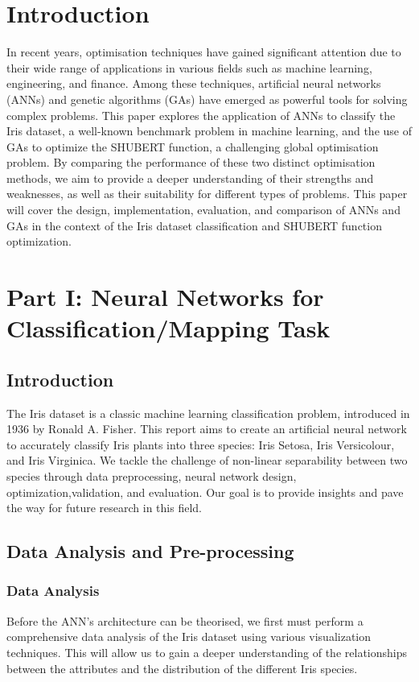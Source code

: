 \documentclass[conference]{inc/IEEEtran}
\begin{document}
\section{Introduction}
In recent years, optimisation techniques have gained significant attention due to their wide range of applications in various fields such as machine learning, engineering, and finance. Among these techniques, artificial neural networks (ANNs) and genetic algorithms (GAs) have emerged as powerful tools for solving complex problems. This paper explores the application of ANNs to classify the Iris dataset, a well-known benchmark problem in machine learning, and the use of GAs to optimize the SHUBERT function, a challenging global optimisation problem. By comparing the performance of these two distinct optimisation methods, we aim to provide a deeper understanding of their strengths and weaknesses, as well as their suitability for different types of problems. This paper will cover the design, implementation, evaluation, and comparison of ANNs and GAs in the context of the Iris dataset classification and SHUBERT function optimization.

\section{Part I: Neural Networks for Classification/Mapping Task}

\subsection{Introduction}

The Iris dataset is a classic machine learning classification problem, introduced in 1936 by Ronald A.
Fisher. This report aims to create an artificial neural network to accurately classify Iris plants into
three species: Iris Setosa, Iris Versicolour, and Iris Virginica. We tackle the challenge of non-linear
separability between two species through data preprocessing, neural network design, optimization,validation,
and evaluation. Our goal is to provide insights and pave the way for future research in this field.

\subsection{Data Analysis and Pre-processing}

\subsubsection{Data Analysis}
Before the ANN's architecture can be theorised, we first must perform a comprehensive data analysis of the
Iris dataset using various visualization techniques. This will allow us to gain a deeper understanding of the
relationships between the attributes and the distribution of the different Iris species.
\end{document}
